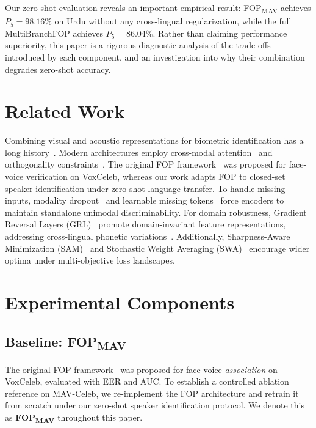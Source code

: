 \documentclass[conference]{IEEEtran}
\newcommand{\fopmav}{FOP\textsubscript{MAV}}
\begin{document}
Our zero-shot evaluation reveals an important empirical result: \fopmav{}
achieves $P_5 = 98.16\%$ on Urdu without any cross-lingual regularization,
while the full MultiBranchFOP achieves $P_5 = 86.04\%$.
Rather than claiming performance superiority, this paper is a
rigorous diagnostic analysis of the trade-offs introduced by each component,
and an investigation into why their combination degrades zero-shot accuracy.

\section{Related Work}
\label{sec:related_work}

Combining visual and acoustic representations for biometric identification has a long history~\cite{nagrani2018seeing, tao2020audiovisual}.
Modern architectures employ cross-modal attention~\cite{tao2020audiovisual} and orthogonality constraints~\cite{fop_original}.
The original FOP framework~\cite{fop_original} was proposed for face-voice verification on VoxCeleb, whereas our work adapts FOP to closed-set speaker identification under zero-shot language transfer.
To handle missing inputs, modality dropout~\cite{neverova2015modality} and learnable missing tokens~\cite{ma2021smil} force encoders to maintain standalone unimodal discriminability.
For domain robustness, Gradient Reversal Layers (GRL)~\cite{ganin2016domain} promote domain-invariant feature representations, addressing cross-lingual phonetic variations~\cite{xia2020cross, wang2022language, chen2023improving}.
Additionally, Sharpness-Aware Minimization (SAM)~\cite{foret2020sharpness} and Stochastic Weight Averaging (SWA)~\cite{izmailov2018averaging} encourage wider optima under multi-objective loss landscapes.

\section{Experimental Components}
\label{sec:experimental_components}

\subsection{Baseline: \fopmav{}}
\label{sec:fopmav}

The original FOP framework~\cite{fop_original} was proposed for face-voice
\textit{association} on VoxCeleb, evaluated with EER and AUC.
To establish a controlled ablation reference on MAV-Celeb, we re-implement
the FOP architecture and retrain it from scratch under our zero-shot
speaker identification protocol.
We denote this as \textbf{\fopmav{}} throughout this paper.
\end{document}
